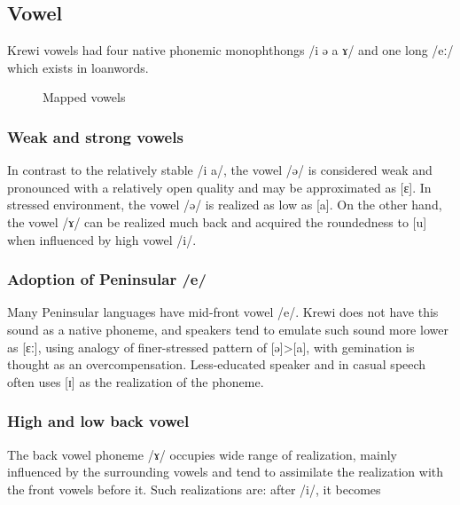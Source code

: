\subsection{Vowel}
Krewi vowels had four native phonemic monophthongs /i ə a ɤ/ and one long /eː/ which exists in loanwords.

\begin{figure}[h]
	\centering
	\caption{Mapped vowels}
\end{figure}

\subsubsection{Weak and strong vowels}
In contrast to the relatively stable /i a/, the vowel /ə/ is considered weak and pronounced with a relatively open quality and may be approximated as [ɛ]. In stressed environment, the vowel /ə/ is realized as low as [a]. On the other hand, the vowel /ɤ/ can be realized much back and acquired the roundedness to [u] when influenced by high vowel /i/.

\subsubsection{Adoption of Peninsular /e/}
Many Peninsular languages have mid-front vowel /e/. Krewi does not have this sound as a native phoneme, and speakers tend to emulate such sound more lower as [ɛː], using analogy of finer-stressed pattern of [ə]>[a], with gemination is thought as an overcompensation. Less-educated speaker and in casual speech often uses [ɪ] as the realization of the phoneme.

\subsubsection{High and low back vowel}
The back vowel phoneme /ɤ/ occupies wide range of realization, mainly influenced by the surrounding vowels and tend to assimilate the realization with the front vowels before it. Such realizations are: after /i/, it becomes

